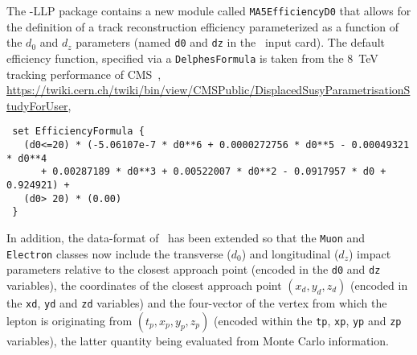 The \DEL-LLP package contains a new module called \verb+MA5EfficiencyD0+ that
allows for the definition of a track reconstruction efficiency parameterized as a function of the $d_0$ and $d_z$ parameters (named \verb+d0+ and \verb+dz+ in the \DEL\ input
card). The default efficiency function, specified via a \verb+DelphesFormula+ is taken from the
8~TeV tracking performance of CMS~\cite{Khachatryan:2014mea},\\
\hspace*{0.5cm}\url{https://twiki.cern.ch/twiki/bin/view/CMSPublic/DisplacedSusyParametrisationStudyForUser},\\
\begin{verbatim}
 set EfficiencyFormula {
   (d0<=20) * (-5.06107e-7 * d0**6 + 0.0000272756 * d0**5 - 0.00049321 * d0**4
      + 0.00287189 * d0**3 + 0.00522007 * d0**2 - 0.0917957 * d0 +  0.924921) +
   (d0> 20) * (0.00)
 }
\end{verbatim}
In addition, the data-format of \DEL\ has been extended so that the \verb+Muon+ and
\verb+Electron+ classes now include the transverse ($d_0$) and longitudinal ($d_z$) impact parameters relative to the closest approach point (encoded
in the \verb+d0+ and \verb+dz+ variables), the coordinates of the closest
approach point $(x_d, y_d, z_d)$ (encoded in the \verb+xd+, \verb+yd+ and
\verb+zd+ variables) and the four-vector of the vertex from which the lepton is
originating from $(t_p, x_p, y_p, z_p)$ (encoded within the \verb+tp+,
\verb+xp+, \verb+yp+ and \verb+zp+ variables), the latter quantity being
evaluated from Monte Carlo information.


